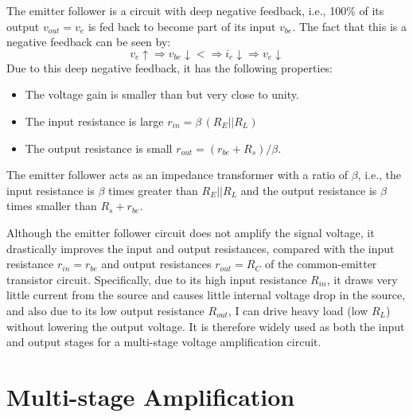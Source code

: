 \begin{itemize}
The emitter follower is a circuit with deep negative feedback, i.e., 
100\% of its output $v_{out}=v_e$ is fed back to become part of its input 
$v_{be}$. The fact that this is a negative feedback can be seen by:
\[ 
v_e \uparrow \Longrightarrow v_{be} \downarrow
<\Longrightarrow i_e \downarrow \Longrightarrow v_e \downarrow 
\]
Due to this deep negative feedback, it has the following properties:
\begin{itemize}
\item The voltage gain is smaller than but very close to unity. 
\item The input resistance is large $r_{in}=\beta \,(R_E||R_L)$
\item The output resistance is small $r_{out}=(r_{be}+R_s)/\beta$.
\end{itemize}

The emitter follower acts as an impedance transformer with a ratio 
of $\beta$, i.e., the input resistance is $\beta$ times greater than 
$R_E||R_L$ and the output resistance is $\beta$ times smaller than 
$R_s+r_{be}$. 

Although the emitter follower circuit does not amplify the signal voltage, 
it drastically improves the input and output resistances, compared with 
the input resistance $r_{in}=r_{be}$ and output resistances $r_{out}=R_C$ of 
the common-emitter transistor circuit. Specifically, due to its high input
resistance $R_{in}$, it draws very little current from the source and causes
little internal voltage drop in the source, and also due to its low output 
resistance $R_{out}$, I can drive heavy load (low $R_L$) without lowering 
the output voltage. It is therefore widely used as both the input and output
stages for a multi-stage voltage amplification circuit.


\begin{comment}
\htmladdimg{../figures/CCCE.png}

$V_{CC}=10\,V$, $\beta=100$, $R_{b1}=100\;k\Omega$, $R_{e1}=0.5\,k\Omega$,
\[
V_{e1}=\frac{V_{CC}-V_{be}}{R_{b1}+(\beta+1)R_{e1}}(\beta+1)R_{e1}
=\frac{9.3}{100+101\times 0.5}(101\times 0.5)=3.1\,V
\]
\[
V_{e2}=V_{b2}-V_{be}=3.1-0.7=2.4\,V,\;\;\;\;\;\;
I_{c2}=\frac{V_{e2}}{R_{e2}}=\frac{2.4}{0.5}=4.8\,mA
\]
For $V_{ce2}=V_{CC}/2=5\,V$, voltage across $R_{c2}$ needs to be 
\end{comment}

\section*{Multi-stage Amplification}


\end{itemize}

